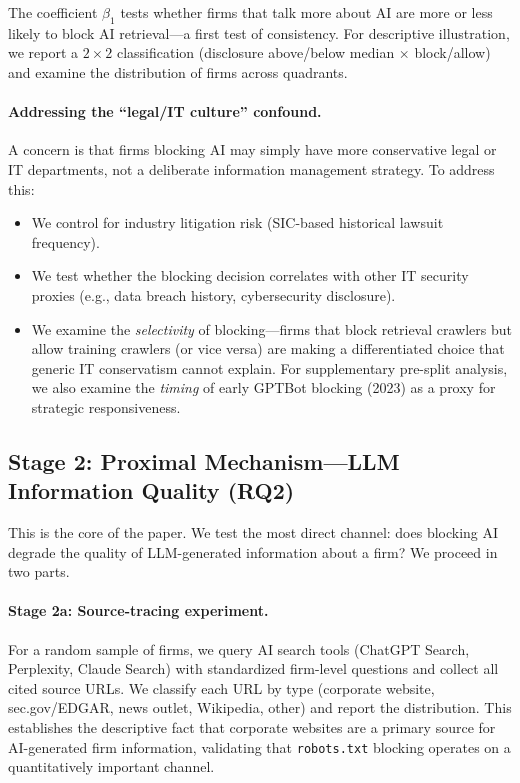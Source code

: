 \documentclass[12pt,a4paper]{article}
\begin{document}
The coefficient $\beta_1$ tests whether firms that talk more about AI are more or less likely to block AI retrieval---a first test of consistency. For descriptive illustration, we report a $2 \times 2$ classification (disclosure above/below median $\times$ block/allow) and examine the distribution of firms across quadrants.

\paragraph{Addressing the ``legal/IT culture'' confound.} A concern is that firms blocking AI may simply have more conservative legal or IT departments, not a deliberate information management strategy. To address this:
\begin{itemize}
    \item We control for industry litigation risk (SIC-based historical lawsuit frequency).
    \item We test whether the blocking decision correlates with other IT security proxies (e.g., data breach history, cybersecurity disclosure).
    \item We examine the \emph{selectivity} of blocking---firms that block retrieval crawlers but allow training crawlers (or vice versa) are making a differentiated choice that generic IT conservatism cannot explain. For supplementary pre-split analysis, we also examine the \emph{timing} of early GPTBot blocking (2023) as a proxy for strategic responsiveness.
\end{itemize}

\subsection{Stage 2: Proximal Mechanism---LLM Information Quality (RQ2)}
\label{sec:stage2}

This is the core of the paper. We test the most direct channel: does blocking AI degrade the quality of LLM-generated information about a firm? We proceed in two parts.

\paragraph{Stage 2a: Source-tracing experiment.} For a random sample of firms, we query AI search tools (ChatGPT Search, Perplexity, Claude Search) with standardized firm-level questions and collect all cited source URLs. We classify each URL by type (corporate website, sec.gov/EDGAR, news outlet, Wikipedia, other) and report the distribution. This establishes the descriptive fact that corporate websites are a primary source for AI-generated firm information, validating that \texttt{robots.txt} blocking operates on a quantitatively important channel.
\end{document}
